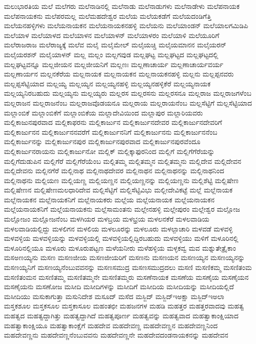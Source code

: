 {ಮಲುಭಾರತಿಯ
ಮಲೆ
ಮಲೆಗರು
ಮಲೆನಾಡಿನಲ್ಲಿ
ಮಲೆನಾಡು
ಮಲೆನಾಡುಗಳು
ಮಲೆನಾಡೇಳು
ಮಲೆಪನಾಯಕ
ಮಲೆಪನಾಯಕನು
ಮಲೆಪರಮಲ್ಲ
ಮಲೆಮಹದೇಶ್ವರ
ಮಲೆಯ
ಮಲೆಯಕಡೆಗೆ
ಮಲೆಯದಂಡಿಗೆತ್ತಿ
ಮಲೆಯನಹಳ್ಳಿಗಳು
ಮಲೆಯನಾಯಕನ
ಮಲೆಯನಾಯಕನಹಳ್ಳಿ
ಮಲೆಯನು
ಮಲೆಯಾಂಡನ್
ಮಲೆಯಾಲಗಮಿಡಿಪಿ
ಮಲೆಯಾಳ
ಮಲೆಯಾಳದ
ಮಲೆಯಾಳನ
ಮಲೆಯಾಳನ್
ಮಲೆಯಾಳರಂ
ಮಲೆಯಾಳಿ
ಮಲೆಯೂರಿಗೆ
ಮಲೆರಾಜರಾಜ
ಮಲೆರಾಜ್ಯಕ್ಕೆ
ಮಲೆವ
ಮಲೈ
ಮಲೈಮೇಲ್
ಮಲೈಯಚ್ಚಿ
ಮಲೈಯಮಾನನ
ಮಲೈಯರನ್
ಮಲೈಯರಶನ್
ಮಲೈಯಾಳನ್
ಮಲ್ಲ
ಮಲ್ಲಂ
ಮಲ್ಲಗವುಡ
ಮಲ್ಲಘಟ್ಟ
ಮಲ್ಲಘಟ್ಟದ
ಮಲ್ಲಘಟ್ಟದಲ್ಲಿ
ಮಲ್ಲಘಟ್ಟವನ್ನೂ
ಮಲ್ಲಜೀಯನ
ಮಲ್ಲಜೀಯನಿಗೆ
ಮಲ್ಲಣಃ
ಮಲ್ಲಣಾಚಾರ್ಯ
ಮಲ್ಲಣಾಚಾರ್ಯವರ್ಯ
ಮಲ್ಲಣಾರ್ಯನ
ಮಲ್ಲನಕೆರೆಯ
ಮಲ್ಲನಾಯಕ
ಮಲ್ಲನಾಯಕನ
ಮಲ್ಲನಾಯಕನಹಳ್ಳಿ
ಮಲ್ಲನು
ಮಲ್ಲಪ್ಪನವರು
ಮಲ್ಲಪ್ಪಸೆಟ್ಟಿಯಾದ
ಮಲ್ಲಯ್ಯ
ಮಲ್ಲಯ್ಯನ
ಮಲ್ಲಯ್ಯನಹಳ್ಳಿ
ಮಲ್ಲಯ್ಯನಹಳ್ಳಿಕೆರೆ
ಮಲ್ಲಯ್ಯನಾಯಕ
ಮಲ್ಲಯ್ಯನಿರಬಹುದು
ಮಲ್ಲಯ್ಯನು
ಮಲ್ಲಯ್ಯರು
ಮಲ್ಲರಸ
ಮಲ್ಲರಸನು
ಮಲ್ಲರಸನೂ
ಮಲ್ಲರಾಜ
ಮಲ್ಲರಾಜಗಳೆಂಬ
ಮಲ್ಲರಾಜನ
ಮಲ್ಲರಾಜನೆಂಬ
ಮಲ್ಲರಾಜವೊಡಯನೂ
ಮಲ್ಲರಾಯ
ಮಲ್ಲರಾಯನೆಂಬ
ಮಲ್ಲಸೆಟ್ಟಿಗೆ
ಮಲ್ಲಸೆಟ್ಟಿಯಾದ
ಮಲ್ಲಾಂಬಿಕೆ
ಮಲ್ಲಾಂಬಿಕೆಗೆ
ಮಲ್ಲಾಂಬಿಕೆಯ
ಮಲ್ಲಾದೇವಿಯಿಂದ
ಮಲ್ಲಾಪುರ
ಮಲ್ಲಾರಿಯವರು
ಮಲ್ಲಿಕಾಜುನಪುರವಾದ
ಮಲ್ಲಿಕಾಫರನು
ಮಲ್ಲಿಕಾರ್ಜುನ
ಮಲ್ಲಿಕಾರ್ಜುನದೇವರ
ಮಲ್ಲಿಕಾರ್ಜುನದೇವರಿಗೆ
ಮಲ್ಲಿಕಾರ್ಜುನನ
ಮಲ್ಲಿಕಾರ್ಜುನನವರೆಗೆ
ಮಲ್ಲಿಕಾರ್ಜುನನಿಗೆ
ಮಲ್ಲಿಕಾರ್ಜುನನು
ಮಲ್ಲಿಕಾರ್ಜುನನೆಂಬ
ಮಲ್ಲಿಕಾರ್ಜುನನ್ನು
ಮಲ್ಲಿಕಾರ್ಜುನಪುರ
ಮಲ್ಲಿಕಾರ್ಜುನಪುರವಾದ
ಮಲ್ಲಿಕಾರ್ಜುನಪುರವೆಂದೂ
ಮಲ್ಲಿಕಾರ್ಜುನರಾಯನು
ಮಲ್ಲಿಕಾರ್ಜುನೋ
ಮಲ್ಲಿಕ್
ಮಲ್ಲಿಕ್ಕಾಫುರನಿಂದ
ಮಲ್ಲಿಗೆ
ಮಲ್ಲಿಗೆಗೆರೆಯನ್ನು
ಮಲ್ಲಿಗೆದುಡುಪಿನ
ಮಲ್ಲಿಗೆರೆ
ಮಲ್ಲಿಗೆರೆಯೆಂಬ
ಮಲ್ಲಿತಮ್ಮ
ಮಲ್ಲಿತಮ್ಮನ
ಮಲ್ಲಿತಮ್ಮನು
ಮಲ್ಲಿದೇವ
ಮಲ್ಲಿದೇವನ
ಮಲ್ಲಿದೇವನು
ಮಲ್ಲಿನಗೆರೆ
ಮಲ್ಲಿನಾಥ
ಮಲ್ಲಿನಾಥದೇವರ
ಮಲ್ಲಿನಾಥನ
ಮಲ್ಲಿನಾಥನನ್ನು
ಮಲ್ಲಿನಾಥನಿಂದ
ಮಲ್ಲಿನಾಥನು
ಮಲ್ಲಿಯಣ
ಮಲ್ಲಿಯಣ್ಣ
ಮಲ್ಲಿಯಣ್ಣನ
ಮಲ್ಲಿಯಣ್ಣನನ್ನು
ಮಲ್ಲಿಯಣ್ಣನು
ಮಲ್ಲಿಶೆಟ್ಟಿ
ಮಲ್ಲಿಷೇಣ
ಮಲ್ಲಿಷೇಣನ
ಮಲ್ಲಿಷೇಣಮಲಧಾರಿದೇವ
ಮಲ್ಲಿಸೆಟ್ಟಿಗೆ
ಮಲ್ಲಿಸೆಟ್ಟಿವಿಭು
ಮಲ್ಲೀದೇವಿಕಟ್ಟೆ
ಮಲ್ಲೆ
ಮಲ್ಲೆನಾಯಕ
ಮಲ್ಲೆನಾಯಕನ
ಮಲ್ಲೆನಾಯಕನಿಗೆ
ಮಲ್ಲೆನಾಯಕರು
ಮಲ್ಲೆಯ
ಮಲ್ಲೆಯನಾಯಕ
ಮಲ್ಲೆಯನಾಯಕನ
ಮಲ್ಲೆಯನಾಯಕನಿಗೆ
ಮಲ್ಲೆಯನಾಯಕನು
ಮಲ್ಲೆಸಾಮಂತನು
ಮಲ್ಲೇನಹಳ್ಳಿ
ಮಲ್ಲೇಪುರಂ
ಮಲ್ಲೇಶ್ವರ
ಮಲ್ಲೋಜ
ಮಲ್ಲೋಜಂ
ಮಲ್ಲೋಜನೆಂಬ
ಮಳಗಿಯರ
ಮಳಬ್ರಯ
ಮಳಭ್ರಯ
ಮಳಲನಕೆರೆ
ಮಳಲವಾಡಿಯ
ಮಳಲವಾಡಿಯಲ್ಲಿದ್ದು
ಮಳಲಿಗನ
ಮಳಲಿಯ
ಮಳಲೂರನ್ನು
ಮಳಲೂರು
ಮಳಲ್ಪಾಚಾರಿ
ಮಳವಡೆ
ಮಳವಳ್ಳಿ
ಮಳವಳ್ಳಿಯ
ಮಳವಳ್ಳಿಯನ್ನು
ಮಳವಳ್ಳಿಯಲ್ಲಿ
ಮಳವಳ್ಳಿಯಲ್ಲಿದ್ದಿರಬಹುದು
ಮಳವಳ್ಳಿಯು
ಮಳಿಗೆ
ಮಳೂರಿನಲ್ಲಿ
ಮಳೂರಿನಲ್ಲಿಯೂ
ಮಳೂರು
ಮಳೂರುಪಟ್ಟಣ
ಮಳೆಯನೀರು
ಮಳೆಹಳ್ಳಿಯ
ಮಳ್ಳಕವ್ವ
ಮವ
ಮಶ್ನುತೇತ್ರೈಕಾಂ
ಮಸಅಣಯ್ಯನು
ಮಸಣ
ಮಸಣಜೀಯ
ಮಸಣಜೀಯರಿಗೆ
ಮಸಣನು
ಮಸಣಯನ
ಮಸಣಯ್ಯನ
ಮಸಣಯ್ಯನನ್ನು
ಮಸಣಯ್ಯನಿಗೆ
ಮಸಣಯ್ಯನೆಂಬುವವನನ್ನು
ಮಸಣಸಮುದ್ರ
ಮಸಣಸಮುದ್ರದಲು
ಮಸಣಿ
ಮಸಣಿಕಮ್ಮ
ಮಸಣಿತಂಮ
ಮಸಣಿತಂಮನ
ಮಸಣಿತಮ್ಮ
ಮಸಣಿತಮ್ಮನೇ
ಮಸಣಿತಮ್ಮರು
ಮಸಣೆನಾಯಕ
ಮಸಣೆಯ
ಮಸಣೈಯ
ಮಸಣೈಯನ
ಮಸಣೈಯನು
ಮಸಣೋಜ
ಮಸೀದಿ
ಮಸೀದಿಗಳನ್ನು
ಮಸೀದಿಗೆ
ಮಸೀದಿಯ
ಮಸೀದಿಯನ್ನು
ಮಸೀದಿಯಲ್ಲಿದೆ
ಮಸೀದಿಯು
ಮಸುಕಾಗುತ್ತಾ
ಮಸುನಿದೇಶ
ಮಸೂದ್
ಮಸೆದ
ಮಸ್ಜಿದ್
ಮಸ್ಜಿದ್ಇಅಕ್ಷಾ
ಮಸ್ಜಿದ್ಇಅಲಾ
ಮಸ್ತಕಶೂಲ
ಮಸ್ತಕಸೂಲ
ಮಸ್ತಕಾಸೂಲ
ಮಹಂತಛೀ
ಮಹಜನಗಳ
ಮಹಡಿ
ಮಹತ್ತರ
ಮಹತ್ತರವಾದವು
ಮಹತ್ವ
ಮಹತ್ವದ
ಮಹತ್ವದ್ದಾಗಿತ್ತು
ಮಹತ್ವದ್ದಾಗಿದೆ
ಮಹತ್ವಪೂರ್ಣ
ಮಹತ್ವವನ್ನು
ಮಹತ್ವವಾದ
ಮಹತ್ವಾಕಾಂಕ್ಷಿಯಾದ
ಮಹತ್ವಾಕಾಂಕ್ಷಿಯೂ
ಮಹತ್ವಾಕಾಂಕ್ಷೆಗೆ
ಮಹದೇವ
ಮಹದೇವಣ್ಣ
ಮಹದೇವಣ್ಣನ
ಮಹದೇವಣ್ಣನಿಂದ
ಮಹದೇವಣ್ಣನು
ಮಹದೇವಣ್ಣನೆಂಬುವವನು
ಮಹದೇವಣ್ಣನೇ
ಮಹದೇವದಂಡನಾಯಕನನ್ನು
ಮಹದೇವನ
}
